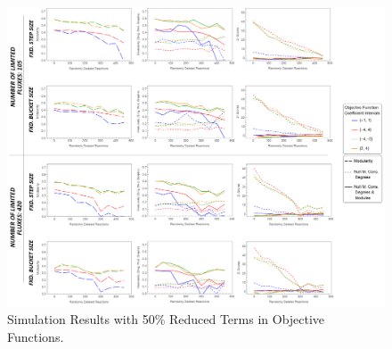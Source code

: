 \begin{landscape}
	\begin{figure}[ht]
		\centering
		\vspace*{-1.5cm}
		\includegraphics[width=1.05\hsize]{../images/results-obj_func_terms_reduced50-simulation-results.png}
		\caption{Simulation Results with 50\% Reduced Terms in Objective Functions.}
		\label{figure-supplements-obj_func-terms-reduced50}
	\end{figure}
\end{landscape}